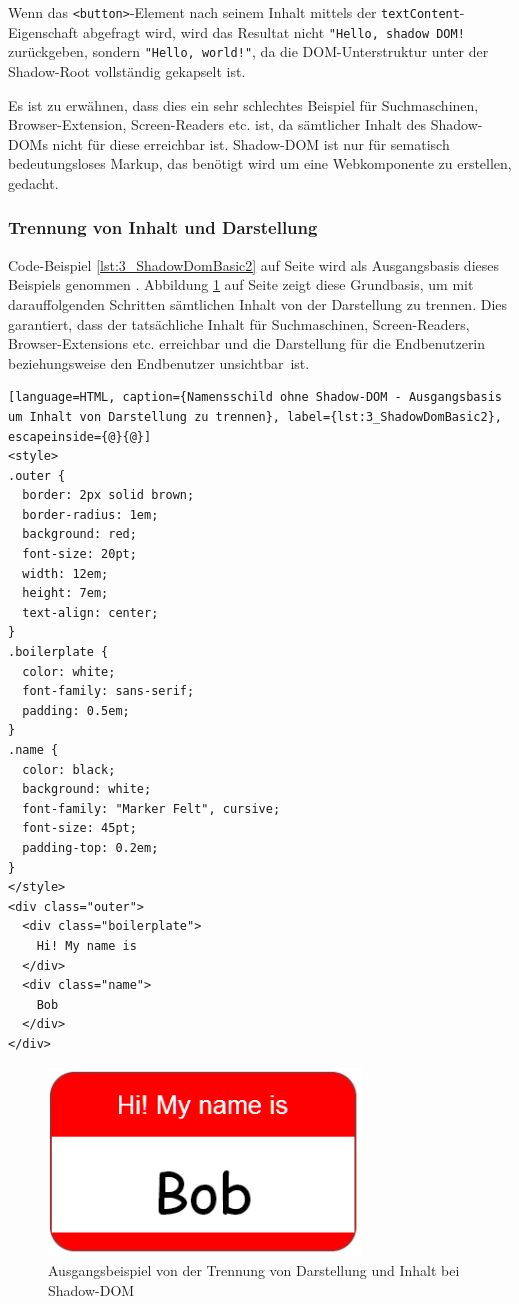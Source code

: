 Wenn das \lstinline|<button>|-Element nach seinem Inhalt mittels der \lstinline|textContent|-Eigenschaft abgefragt wird, wird das Resultat nicht \lstinline|"Hello, shadow DOM!| zurückgeben, sondern \lstinline|"Hello, world!"|, da die DOM-Unterstruktur unter der Shadow-Root vollständig gekapselt ist.

Es ist zu erwähnen, dass dies ein sehr schlechtes Beispiel für Suchmaschinen, Browser-Extension, Screen-Readers etc. ist, da sämtlicher Inhalt des Shadow-DOMs nicht für diese erreichbar ist. Shadow-DOM ist nur für sematisch bedeutungsloses Markup, das benötigt wird um eine Webkomponente zu erstellen, gedacht.

\subsubsection{Trennung von Inhalt und Darstellung}
\label{sec:3_WC_Shadow_DOM1}

Code-Beispiel \ref{lst:3_ShadowDomBasic2} auf Seite \pageref{lst:3_ShadowDomBasic2} wird als Ausgangsbasis dieses Beispiels genommen \citereset \autocite[siehe][]{Cooney.2013}. Abbildung \ref{fig:3_ShadowDom2} auf Seite \pageref{fig:3_ShadowDom2} zeigt diese Grundbasis, um mit darauffolgenden Schritten sämtlichen Inhalt von der Darstellung zu trennen. Dies garantiert, dass der tatsächliche Inhalt für Suchmaschinen, Screen-Readers, Browser-Extensions etc. erreichbar und die Darstellung für die Endbenutzerin beziehungsweise den Endbenutzer \glqq unsichtbar\grqq\ ist.

\begin{lstlisting}[language=HTML, caption={Namensschild ohne Shadow-DOM - Ausgangsbasis um Inhalt von Darstellung zu trennen}, label={lst:3_ShadowDomBasic2}, escapeinside={@}{@}]
<style>
.outer {
  border: 2px solid brown;
  border-radius: 1em;
  background: red;
  font-size: 20pt;
  width: 12em;
  height: 7em;
  text-align: center;
}
.boilerplate {
  color: white;
  font-family: sans-serif;
  padding: 0.5em;
}
.name {
  color: black;
  background: white;
  font-family: "Marker Felt", cursive;
  font-size: 45pt;
  padding-top: 0.2em;
}
</style>
<div class="outer">
  <div class="boilerplate">
    Hi! My name is
  </div>
  <div class="name">
    Bob
  </div>
</div>
\end{lstlisting}

\begin{figure}[h]
\centering
\includegraphics[height=5.0cm]{images/SS3.png}
\caption[
  Ausgangsbeispiel von der Trennung von Darstellung und Inhalt bei Shadow-DOM \citereset \autocite{Cooney.2013}
]{Ausgangsbeispiel von der Trennung von Darstellung und Inhalt bei Shadow-DOM}
\label{fig:3_ShadowDom2}
\end{figure}


